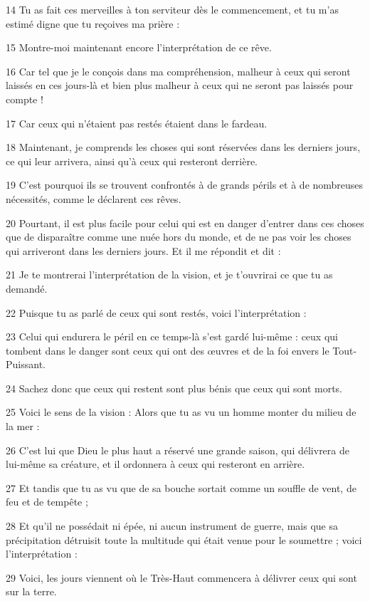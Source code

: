\par 14 Tu as fait ces merveilles à ton serviteur dès le commencement, et tu m'as estimé digne que tu reçoives ma prière :
\par 15 Montre-moi maintenant encore l'interprétation de ce rêve.
\par 16 Car tel que je le conçois dans ma compréhension, malheur à ceux qui seront laissés en ces jours-là et bien plus malheur à ceux qui ne seront pas laissés pour compte !
\par 17 Car ceux qui n'étaient pas restés étaient dans le fardeau.
\par 18 Maintenant, je comprends les choses qui sont réservées dans les derniers jours, ce qui leur arrivera, ainsi qu'à ceux qui resteront derrière.
\par 19 C'est pourquoi ils se trouvent confrontés à de grands périls et à de nombreuses nécessités, comme le déclarent ces rêves.
\par 20 Pourtant, il est plus facile pour celui qui est en danger d'entrer dans ces choses que de disparaître comme une nuée hors du monde, et de ne pas voir les choses qui arriveront dans les derniers jours. Et il me répondit et dit :
\par 21 Je te montrerai l'interprétation de la vision, et je t'ouvrirai ce que tu as demandé.
\par 22 Puisque tu as parlé de ceux qui sont restés, voici l'interprétation :
\par 23 Celui qui endurera le péril en ce temps-là s'est gardé lui-même : ceux qui tombent dans le danger sont ceux qui ont des œuvres et de la foi envers le Tout-Puissant.
\par 24 Sachez donc que ceux qui restent sont plus bénis que ceux qui sont morts.
\par 25 Voici le sens de la vision : Alors que tu as vu un homme monter du milieu de la mer :
\par 26 C'est lui que Dieu le plus haut a réservé une grande saison, qui délivrera de lui-même sa créature, et il ordonnera à ceux qui resteront en arrière.
\par 27 Et tandis que tu as vu que de sa bouche sortait comme un souffle de vent, de feu et de tempête ;
\par 28 Et qu'il ne possédait ni épée, ni aucun instrument de guerre, mais que sa précipitation détruisit toute la multitude qui était venue pour le soumettre ; voici l'interprétation :
\par 29 Voici, les jours viennent où le Très-Haut commencera à délivrer ceux qui sont sur la terre.
